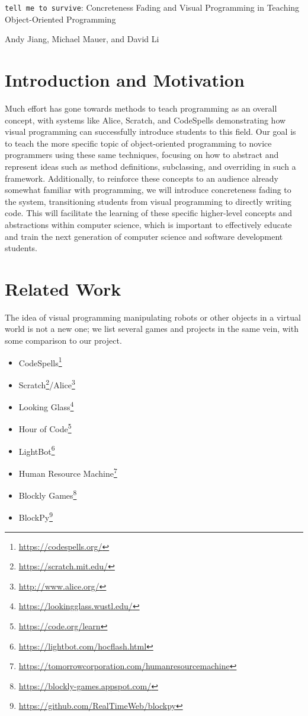 \documentclass[12pt,notitlepage]{article}
\newcommand\footnoteref[1]{\footnote{\url{#1}}}
\begin{document}
\begingroup
  \centering
  {\Large \texttt{tell me to survive}: Concreteness Fading and Visual
    Programming in Teaching Object-Oriented Programming\\[1em]}

  Andy Jiang, Michael Mauer, and David Li\par
\endgroup

\section{Introduction and Motivation}

Much effort has gone towards methods to teach programming as an
overall concept, with systems like Alice, Scratch, and CodeSpells
demonstrating how visual programming can successfully introduce
students to this field. Our goal is to teach the more specific topic
of object-oriented programming to novice programmers using these same
techniques, focusing on how to abstract and represent ideas such as
method definitions, subclassing, and overriding in such a framework.
Additionally, to reinforce these concepts to an audience already
somewhat familiar with programming, we will introduce concreteness
fading to the system, transitioning students from visual programming
to directly writing code. This will facilitate the learning of these
specific higher-level concepts and abstractions within computer
science, which is important to effectively educate and train the next
generation of computer science and software development students.

\section{Related Work}

The idea of visual programming manipulating robots or other objects in
a virtual world is not a new one; we list several games and projects
in the same vein, with some comparison to our project.

\begin{itemize}
\item CodeSpells\footnoteref{https://codespells.org/}
\item Scratch\footnoteref{https://scratch.mit.edu/}/Alice\footnoteref{http://www.alice.org/}
\item Looking Glass\footnoteref{https://lookingglass.wustl.edu/}
\item Hour of Code\footnoteref{https://code.org/learn}
\item LightBot\footnoteref{https://lightbot.com/hocflash.html}
\item Human Resource Machine\footnoteref{https://tomorrowcorporation.com/humanresourcemachine}
\item Blockly Games\footnoteref{https://blockly-games.appspot.com/}
\item BlockPy\footnoteref{https://github.com/RealTimeWeb/blockpy}
\end{itemize}
\end{document}
